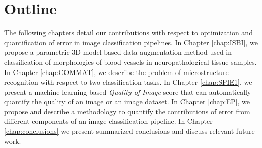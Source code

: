 \section{Outline}
The following chapters detail our contributions with respect to optimization and quantification of error in image classification pipelines.
In Chapter \ref{chap:ISBI}, we propose a parametric 3D model based data augmentation method used in classification of morphologies of blood vessels in neuropathological tissue samples. 
In Chapter \ref{chap:COMMAT}, we describe the problem of microstructure recognition with respect to two classification tasks. 
In Chapter \ref{chap:SPIE1}, we present a machine learning based \textit{Quality of Image} score that can automatically quantify the quality of an image or an image dataset.
In Chapter \ref{chap:EP}, we propose and describe a methodology to quantify the contributions of error from different components of an image classification pipeline. 
In Chapter \ref{chap:conclusions} we present summarized conclusions and discuss relevant future
work. 